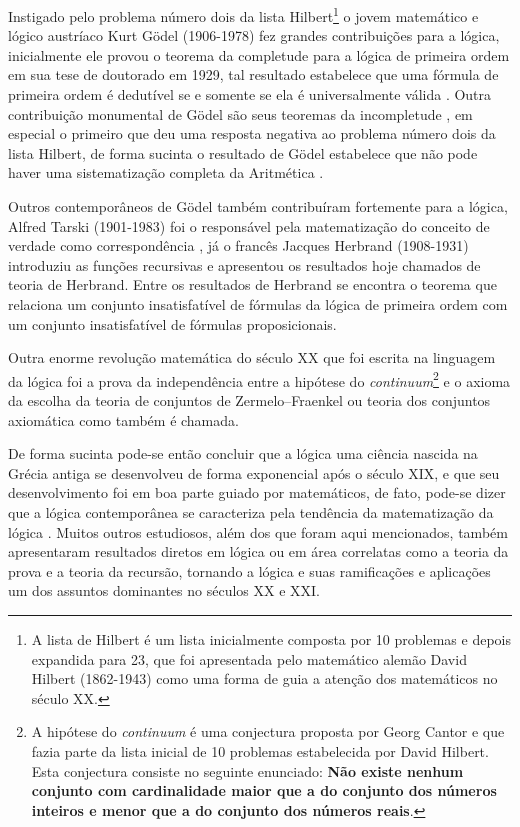 Instigado pelo problema número dois da lista Hilbert\footnote{A lista de Hilbert é um lista inicialmente composta por 10 problemas e depois expandida para 23, que foi apresentada pelo matemático alemão David Hilbert (1862-1943) como uma forma de guia a atenção dos matemáticos no século XX.} o jovem matemático e lógico austríaco Kurt Gödel (1906-1978) fez grandes contribuições para a lógica, inicialmente ele provou o teorema da completude para a lógica de primeira ordem em sua tese de doutorado em 1929, tal resultado estabelece que uma fórmula de primeira ordem é dedutível se e somente se ela é universalmente válida \cite{BenjaV1}. Outra contribuição monumental de Gödel são seus teoremas da incompletude \cite{godel1931}, em especial o primeiro que deu uma resposta negativa ao problema número dois da lista Hilbert, de forma sucinta o resultado de Gödel estabelece que não pode haver uma sistematização completa da Aritmética  \cite{abe2002-logica}.

Outros contemporâneos de Gödel também contribuíram fortemente para a lógica, Alfred Tarski (1901-1983) foi o responsável pela matematização do conceito de verdade como correspondência \cite{abe2002-logica, tarski1983}, já o francês Jacques Herbrand (1908-1931) introduziu as funções recursivas e apresentou os resultados hoje chamados de teoria de Herbrand. Entre os resultados de Herbrand se encontra o teorema que relaciona um conjunto insatisfatível de fórmulas da lógica de primeira ordem com um conjunto insatisfatível de fórmulas proposicionais.

Outra enorme revolução matemática do século XX que foi escrita na linguagem da lógica foi a prova da independência entre a hipótese do \textit{continuum}\footnote{A hipótese do \textit{continuum} é uma conjectura proposta por Georg Cantor e que fazia parte da lista inicial de 10 problemas estabelecida por David Hilbert. Esta conjectura consiste no seguinte enunciado: \textbf{Não existe nenhum conjunto com cardinalidade maior que a do conjunto dos números inteiros e menor que a do conjunto dos números reais}.} e o axioma da escolha da teoria de conjuntos de Zermelo–Fraenkel ou teoria dos conjuntos axiomática como também é chamada.

De forma sucinta pode-se então concluir que a lógica uma ciência nascida na Grécia antiga se desenvolveu de forma exponencial após o século XIX, e que seu desenvolvimento foi em boa parte guiado por matemáticos, de fato, pode-se dizer que a lógica contemporânea se caracteriza pela tendência da matematização da lógica \cite{barreto1998}. Muitos outros estudiosos, além dos que foram aqui mencionados, também apresentaram resultados diretos em lógica ou em área correlatas como a teoria da prova e a teoria da recursão, tornando a lógica e suas ramificações e aplicações um dos assuntos dominantes no séculos XX e XXI. 

